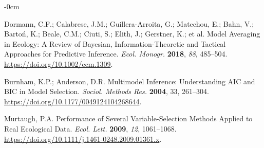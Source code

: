 \documentclass[entropy,article,accept,pdftex,moreauthors]{Definitions/mdpi}
\begin{document}
\begin{adjustwidth}{-\extralength}{0cm}
\begin{thebibliography}{999}
Dormann, C.F.; Calabrese, J.M.; Guillera-Arroita, G.; Matechou, E.; Bahn, V.; Bartoń, K.; Beale, C.M.; Ciuti, S.; Elith, J.; Gerstner, K.; et al. Model Averaging in Ecology: A Review of {Bayesian},
Information-Theoretic and Tactical Approaches for Predictive
Inference. \emph{Ecol. Monogr.} \textbf{2018}, \emph{88}, 485--504.
\url{https://doi.org/10.1002/ecm.1309}.

Burnham, K.P.; Anderson, D.R. {Multimodel Inference: Understanding {AIC} and {BIC}
in Model Selection}. \emph{Sociol. Methods Res.} \textbf{2004}, 33, 
261--304. \url{https://doi.org/10.1177/0049124104268644}.


Murtaugh, P.A. Performance of Several Variable-Selection
Methods Applied to Real Ecological Data.  \emph{Ecol. Lett.} \textbf{2009}, \emph{12}, 1061--1068. \url{https://doi.org/10.1111/j.1461-0248.2009.01361.x}.

\end{thebibliography}

%


\PublishersNote{}
\end{adjustwidth}
\end{document}
